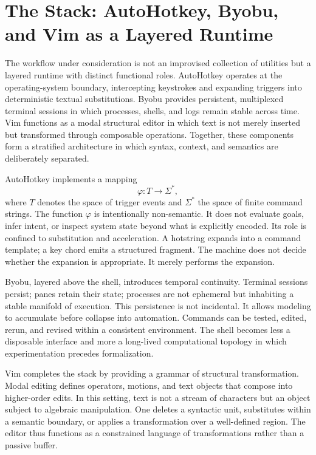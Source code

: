 \documentclass[11pt]{article}
\begin{document}
\section{The Stack: AutoHotkey, Byobu, and Vim as a Layered Runtime}

The workflow under consideration is not an improvised collection of utilities but a layered runtime with distinct functional roles. AutoHotkey operates at the operating-system boundary, intercepting keystrokes and expanding triggers into deterministic textual substitutions. Byobu provides persistent, multiplexed terminal sessions in which processes, shells, and logs remain stable across time. Vim functions as a modal structural editor in which text is not merely inserted but transformed through composable operations. Together, these components form a stratified architecture in which syntax, context, and semantics are deliberately separated.

AutoHotkey implements a mapping
\[
\varphi : T \to \Sigma^{*},
\]
where \(T\) denotes the space of trigger events and \(\Sigma^{*}\) the space of finite command strings. The function \(\varphi\) is intentionally non-semantic. It does not evaluate goals, infer intent, or inspect system state beyond what is explicitly encoded. Its role is confined to substitution and acceleration. A hotstring expands into a command template; a key chord emits a structured fragment. The machine does not decide whether the expansion is appropriate. It merely performs the expansion.

Byobu, layered above the shell, introduces temporal continuity. Terminal sessions persist; panes retain their state; processes are not ephemeral but inhabiting a stable manifold of execution. This persistence is not incidental. It allows modeling to accumulate before collapse into automation. Commands can be tested, edited, rerun, and revised within a consistent environment. The shell becomes less a disposable interface and more a long-lived computational topology in which experimentation precedes formalization.

Vim completes the stack by providing a grammar of structural transformation. Modal editing defines operators, motions, and text objects that compose into higher-order edits. In this setting, text is not a stream of characters but an object subject to algebraic manipulation. One deletes a syntactic unit, substitutes within a semantic boundary, or applies a transformation over a well-defined region. The editor thus functions as a constrained language of transformations rather than a passive buffer.
\end{document}

